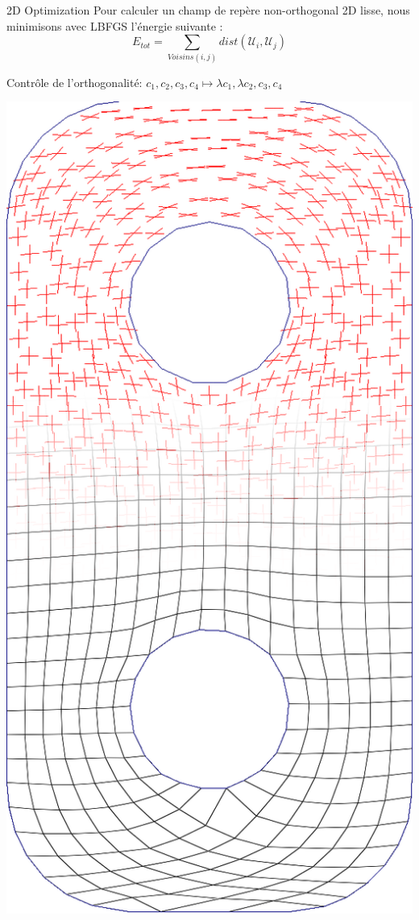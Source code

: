\documentclass{beamer}
\begin{document}
\begin{frame}{2D Optimization}
    \centering
    \small
    Pour calculer un champ de repère non-orthogonal 2D lisse, nous minimisons avec LBFGS l'énergie suivante :
    $$ E_{tot} = \sum_{Voisins(i, j)} dist(\mathcal{U}_i, \mathcal{U}_j)$$
    
    Contrôle de l'orthogonalité: $c_1, c_2, c_3, c_4 \mapsto \lambda c_1, \lambda c_2, c_3, c_4$ 
     
     \vspace*{0.5\baselineskip}
    \begin{minipage}[b]{0.15\textwidth}
        \centering
        \includegraphics[width=\textwidth]{img_spm_ff/perced_1}

\end{minipage}
\end{frame}
\end{document}
